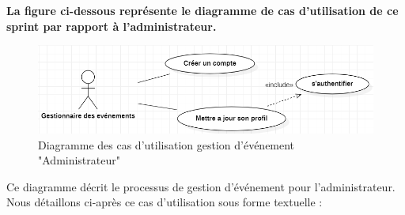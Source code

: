 \textbf{La figure ci-dessous représente le diagramme de cas d'utilisation de ce sprint par rapport à l'administrateur.}

\begin{figure}[H]
    \centering
    \includegraphics[width=0.6\linewidth]{projet/images/diagramme de sequance/images/gestionnaire.png}
    \caption{Diagramme des cas d'utilisation gestion d'événement "Administrateur"}
    \label{fig:AdminEvent}
\end{figure}

Ce diagramme décrit le processus de gestion d'événement pour l'administrateur. Nous détaillons ci-après ce cas d'utilisation sous forme textuelle :